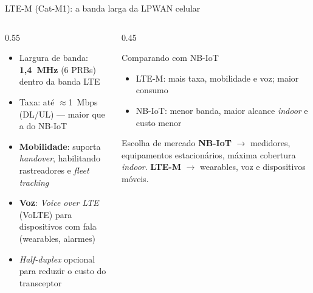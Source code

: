 \documentclass[aspectratio=169,11pt]{beamer}
\begin{document}
\begin{frame}{LTE-M (Cat-M1): a banda larga da LPWAN celular}
  \begin{columns}
    \begin{column}{0.55\textwidth}
      \begin{itemize}
        \item Largura de banda: \textbf{1,4~MHz} (6 PRBs) dentro da banda LTE
        \item Taxa: até $\approx$1~Mbps (DL/UL) --- maior que a do NB-IoT
        \item \textbf{Mobilidade}: suporta \emph{handover}, habilitando rastreadores e \emph{fleet tracking}
        \item \textbf{Voz}: \emph{Voice over LTE} (VoLTE) para dispositivos com fala (wearables, alarmes)
        \item \emph{Half-duplex} opcional para reduzir o custo do transceptor
      \end{itemize}
    \end{column}
    \begin{column}{0.45\textwidth}
      \begin{block}{Comparando com NB-IoT}
        \begin{itemize}
          \item LTE-M: mais taxa, mobilidade e voz; maior consumo
          \item NB-IoT: menor banda, maior alcance \emph{indoor} e custo menor
        \end{itemize}
      \end{block}
      \pause
      \begin{exampleblock}{Escolha de mercado}
        \textbf{NB-IoT} $\rightarrow$ medidores, equipamentos estacionários, máxima cobertura \emph{indoor}. \textbf{LTE-M} $\rightarrow$ wearables, voz e dispositivos móveis.
      \end{exampleblock}
    \end{column}
  \end{columns}
\end{frame}
\end{document}
